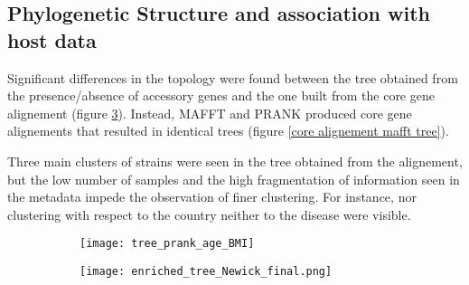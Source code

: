 \subsection*{Phylogenetic Structure and association with host data}
\graphicspath{{images/phylogeneticStructureHostData/}}




Significant differences in the topology were found between the tree obtained from the presence/absence of accessory genes
and the one built from the core gene alignement (figure \ref{fig:phylogenetic trees}). Instead,
MAFFT and PRANK produced core gene alignements that resulted in identical trees
(figure \ref{core alignement mafft tree}). 

Three main clusters of strains were seen in the tree obtained from the alignement, but the low number of samples and the high fragmentation of
information seen in the metadata impede the observation of finer clustering. 
For instance, nor clustering with respect to the country neither to the disease were visible.


\begin{figure}[h!]
    \centering
    \begin{subfigure}[b]{0.8\textwidth}
        \centering
        \texttt{[image: tree\_prank\_age\_BMI]}
        \caption{}
        \label{fig:core alignment prank tree}
    \end{subfigure}
    \begin{subfigure}[b]{0.7\textwidth}
        \centering
        \texttt{[image: enriched\_tree\_Newick\_final.png]}
        \caption{}
        \label{fig:presence absence tree}
    \end{subfigure}
       \caption{}
       \label{fig:phylogenetic trees}
\end{figure}






